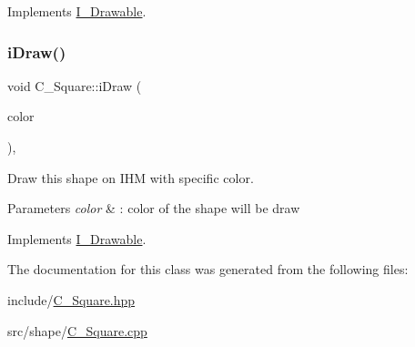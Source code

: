 Implements \hyperlink{classI__Drawable_a25f6474325614c451a91f019e5fe8010}{I\+\_\+\+Drawable}.

\mbox{\label{classC__Square_a47a80c25bbeda17f17a8230127b4a5ed}} 
\subsubsection{\texorpdfstring{i\+Draw()}{iDraw()}\hspace{0.1cm}{\footnotesize\ttfamily [4/4]}}
{\footnotesize\ttfamily void C\+\_\+\+Square\+::i\+Draw (\begin{DoxyParamCaption}\item[{M\+L\+V\+\_\+\+Color}]{color }\end{DoxyParamCaption})\hspace{0.3cm}{\ttfamily [override]}, {\ttfamily [virtual]}}



Draw this shape on I\+HM with specific color. 


\begin{DoxyParams}{Parameters}
{\em color} & \+: color of the shape will be draw \\
\hline
\end{DoxyParams}


Implements \hyperlink{classI__Drawable_a25f6474325614c451a91f019e5fe8010}{I\+\_\+\+Drawable}.



The documentation for this class was generated from the following files\+:\begin{DoxyCompactItemize}
\item 
include/\hyperlink{C__Square_8hpp}{C\+\_\+\+Square.\+hpp}\item 
src/shape/\hyperlink{C__Square_8cpp}{C\+\_\+\+Square.\+cpp}\end{DoxyCompactItemize}
